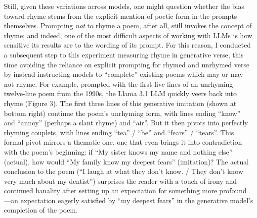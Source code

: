 \documentclass{simple-humanities}         %
\begin{document}
Still, given these variations across models, one might question whether the bias toward rhyme stems from the explicit mention of poetic form in the prompts themselves.
Prompting \emph{not} to rhyme a poem, after all, still invokes the concept of rhyme; and indeed, one of the most difficult aspects of working with LLMs is how sensitive its results are to the wording of its prompt.
For this reason, I conducted a subsequent step to this experiment measuring rhyme in generative verse, this time avoiding the reliance on explicit prompting for rhymed and unrhymed verse by instead instructing models to ``complete'' existing poems which may or may not rhyme.
For example, prompted with the first five lines of an unrhyming twelve-line poem from the 1990s, the Llama 3.1 LLM quickly veers back into rhyme (Figure 3).
The first three lines of this generative imitation (shown at bottom right) continue the poem's unrhyming form, with lines ending ``know'' and ``annoy'' (perhaps a slant rhyme) and ``air''.
But it then pivots into perfectly rhyming couplets, with lines ending ``tea'' / ``be'' and ``fears'' / ``tears''.
This formal pivot mirrors a thematic one, one that even brings it into contradiction with the poem's beginning: if ``My sister knows my name and nothing else'' (actual), how would ``My family know my deepest fears'' (imitation)?
The actual conclusion to the poem (``I laugh at what they don't know. / They don't know very much about my dentist'') surprises the reader with a touch of irony and continued banality after setting up an expectation for something more profound---an expectation eagerly satisfied by ``my deepest fears'' in the generative model's completion of the poem.
\end{document}
